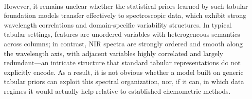 \documentclass{article}
\begin{document}
~

However, it remains unclear whether the statistical priors learned by such tabular foundation models transfer effectively to spectroscopic data, which exhibit strong wavelength correlations and domain-specific variability structures. In typical tabular settings, features are unordered variables with heterogeneous semantics across columns; in contrast, NIR spectra are strongly ordered and smooth along the wavelength axis, with adjacent variables highly correlated and largely redundant---an intricate structure that standard tabular representations do not explicitly encode. As a result, it is not obvious whether a model built on generic tabular priors can exploit this spectral organization, nor, if it can, in which data regimes it would actually help relative to established chemometric methods.

~
\end{document}
